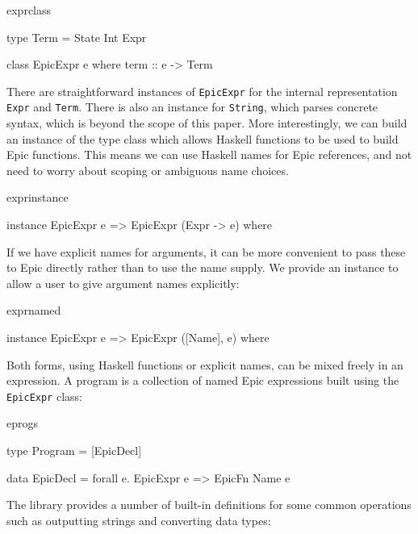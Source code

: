 \begin{SaveVerbatim}{exprclass}

type Term = State Int Expr

class EpicExpr e where
    term :: e -> Term

\end{SaveVerbatim}

There are straightforward instances of \texttt{EpicExpr} for the
internal representation \texttt{Expr} and \texttt{Term}. There is also
an instance for \texttt{String}, which parses concrete syntax, which
is beyond the scope of this paper. More interestingly, we can build an
instance of the type class which allows Haskell functions to be used
to build Epic functions.  This means we can use Haskell names for Epic
references, and not need to worry about scoping or ambiguous name
choices. 

\begin{SaveVerbatim}{exprinstance}

instance EpicExpr e => EpicExpr (Expr -> e) where

\end{SaveVerbatim}

\noindent
If we have explicit names for arguments, it can be more convenient to
pass these to Epic directly rather than to use the name supply. We
provide an instance to allow a user to give argument names explicitly:

\begin{SaveVerbatim}{exprnamed}

instance EpicExpr e => EpicExpr ([Name], e) where

\end{SaveVerbatim}

\noindent
Both forms, using Haskell functions or explicit names, can be mixed
freely in an expression. A program is a collection of named Epic
expressions built using the \texttt{EpicExpr} class:

\begin{SaveVerbatim}{eprogs}

type Program = [EpicDecl]

data EpicDecl = forall e. EpicExpr e => EpicFn Name e

\end{SaveVerbatim}

\noindent
The library provides a number of built-in definitions for some common
operations such as outputting strings and converting data types:


